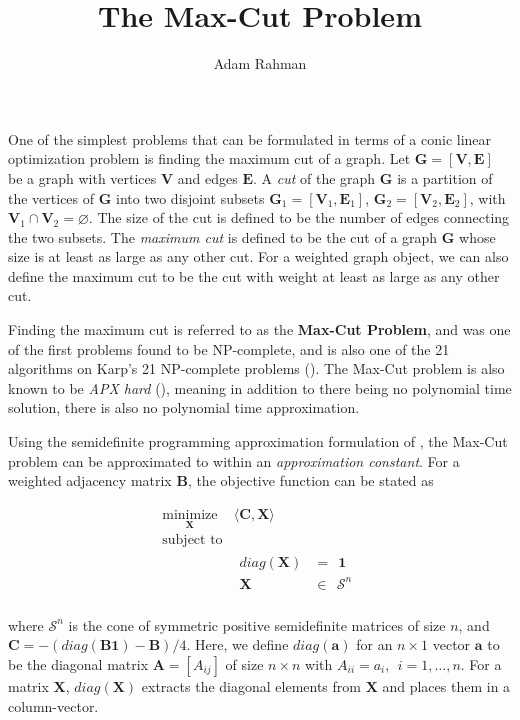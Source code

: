 \documentclass{article}
\author{Adam Rahman}
\title{The Max-Cut Problem}
\newcommand{\ve}[1]{\mathbf{#1}}           %
\newcommand{\m}[1]{\mathbf{#1}}               %
\let\emptyset\varnothing
\begin{document}
\maketitle

One of the simplest problems that can be formulated in terms of a conic linear optimization problem is finding the maximum cut of a graph. Let $\m{G} = [\m{V},\m{E}]$ be a graph with vertices $\m{V}$ and edges $\m{E}$. A \emph{cut} of the graph $\m{G}$ is a partition of the vertices of $\m{G}$ into two disjoint subsets $\m{G}_{1} = [\m{V}_{1},\m{E}_{1}]$, $\m{G}_{2} = [\m{V}_{2},\m{E}_{2}]$, with $\m{V}_{1} \cap \m{V}_{2} = \emptyset$. The size of the cut is defined to be the number of edges connecting the two subsets. The \emph{maximum cut} is defined to be the cut of a graph $\m{G}$ whose size is at least as large as any other cut. For a weighted graph object, we can also define the maximum cut to be the cut with weight at least as large as any other cut. 

Finding the maximum cut is referred to as the \textbf{Max-Cut Problem}, and was one of the first problems found to be NP-complete, and is also one of the 21 algorithms on Karp's 21 NP-complete problems (\cite{karp1972reducibility}). The Max-Cut problem is also known to be \emph{APX hard} (\cite{papadimitriou1991optimization}), meaning in addition to there being no polynomial time solution, there is also no polynomial time approximation. 

Using the semidefinite programming approximation formulation of \cite{goemans1995improved}, the Max-Cut problem can be approximated to within an \emph{approximation constant}. For a weighted adjacency matrix $\m{B}$, the objective function can be stated as

\[
\begin{array}{ll}
\underset{\m{X}}{\text{minimize}} & \langle \m{C},\m{X} \rangle \\
\text{subject to} & \\
& 
\begin{array}{rl}
diag(\m{X}) &=~~ \ve{1} \\
\m{X} & \in~~\mathcal{S}^{n} \\
\end{array}
\end{array}
\]

\noindent where $\mathcal{S}^{n}$ is the cone of symmetric positive semidefinite matrices of size $n$, and $\m{C} = -(diag(\m{B}\ve{1}) - \m{B})/4$. Here, we define $diag(\ve{a})$ for an $n \times 1$ vector $\ve{a}$ to be the diagonal matrix $\m{A} = [A_{ij}]$ of size $n \times n$ with $A_{ii} = a_{i},~~ i=1,\dots,n$. For a matrix $\m{X}$, $diag(\m{X})$ extracts the diagonal elements from $\m{X}$ and places them in a column-vector.
\end{document}
